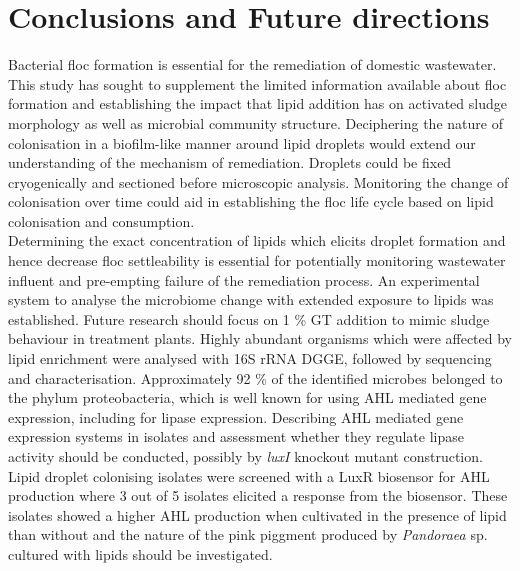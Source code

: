 \documentclass[twoside]{article}
\begin{document}
\section{Conclusions and Future directions}
\thispagestyle{plain}
Bacterial floc formation is essential for the remediation of domestic wastewater. This study has sought to supplement the limited information available about floc formation and establishing the impact that lipid addition has on activated sludge morphology as well as microbial community structure. Deciphering the nature of colonisation in a biofilm-like manner around lipid droplets would extend our understanding of the mechanism of remediation. Droplets could be fixed cryogenically and sectioned before microscopic analysis. Monitoring the change of colonisation over time could aid in establishing the floc life cycle based on lipid colonisation and consumption. \\


Determining the exact concentration of lipids which elicits droplet formation and hence decrease floc settleability is essential for potentially monitoring wastewater influent and pre-empting failure of the remediation process. An experimental system to analyse the microbiome change with extended exposure to lipids was established. Future research should focus on 1 \% GT addition to mimic sludge behaviour in treatment plants. Highly abundant organisms which were affected by lipid enrichment were analysed with 16S rRNA DGGE, followed by sequencing and characterisation. Approximately 92 \% of the identified microbes belonged to the phylum proteobacteria, which is well known for using AHL mediated gene expression, including for lipase expression. Describing AHL mediated gene expression systems in isolates and assessment whether they regulate lipase activity should be conducted, possibly by \emph{luxI} knockout mutant construction.\\

Lipid droplet colonising isolates were screened with a LuxR biosensor for AHL production where 3 out of 5 isolates elicited a response from the biosensor. These isolates showed a higher AHL production when cultivated in the presence of lipid than without and the nature of the pink piggment produced by \emph{Pandoraea} sp. cultured with lipids should be investigated.
\newpage 
\thispagestyle{plain}



\newpage 
\FloatBarrier
\end{document}
